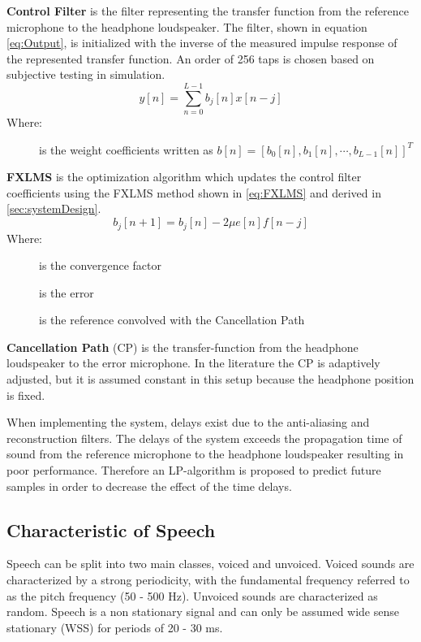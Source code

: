 \textbf{Control Filter} is the filter representing the transfer function from the reference microphone to the headphone loudspeaker. The filter, shown in equation \ref{eq:Output}, is initialized with the inverse of the measured impulse response of the represented transfer function. An order of 256 taps is chosen based on subjective testing in simulation. 
\vspace{-3mm} %
\begin{equation}\label{eq:Output}
y[n]=\sum_{n=0}^{L-1}b_j[n]x[n-j]
\end{equation}
Where:
\vspace{-7mm} %
\begin{description}
	\item[] is the weight coefficients written as  $b[n]=[b_0[n],b_1[n], \cdots, b_{L-1}[n]]^T$
\end{description}

\textbf{FXLMS} is the optimization algorithm which updates the control filter coefficients using the FXLMS method shown in \autoref{eq:FXLMS} and derived in \autoref{sec:systemDesign}. 
\begin{equation}\label{eq:FXLMS}
b_j[n+1] = b_j[n] - 2\mu e[n]f[n-j]
\end{equation}
Where:
\vspace{-8mm} %
\begin{description}
	\item[\text{$\mu$}] is the convergence factor
	\item[] is the error 
	\item[] is the reference convolved with the Cancellation Path
\end{description}

\textbf{Cancellation Path} (CP) is the transfer-function from the headphone loudspeaker to the error microphone. In the literature \cite{Hansen} the CP is adaptively adjusted, but it is assumed constant in this setup because the headphone position is fixed.     


When implementing the system, delays exist due to the anti-aliasing and reconstruction filters. The delays of the system exceeds the propagation time of sound from the reference microphone to the headphone loudspeaker resulting in poor performance. Therefore an LP-algorithm is proposed to predict future samples in order to decrease the effect of the time delays.

\subsection{Characteristic of Speech}
Speech can be split into two main classes, voiced and unvoiced. Voiced sounds are characterized by a strong periodicity, with the fundamental frequency referred to as the pitch frequency (50 - 500 Hz). Unvoiced sounds are characterized as random. Speech is a non stationary signal and can only be assumed wide sense stationary (WSS) for periods of 20 - 30 ms\cite{SpeechCharacteristics}. 

